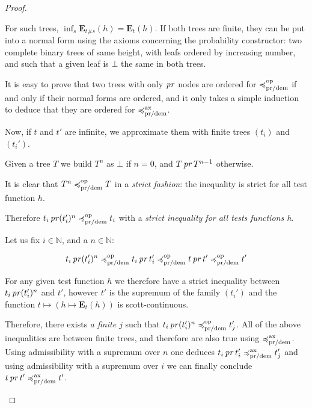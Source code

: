 \begin{proof}
\begin{itemize}
\begin{description}

    For such trees, $\inf_s \mathbf{E}_{ t \# s } (h)
    = \mathbf{E}_{ t } (h)$.
    If both trees are finite, they can be put into 
    a normal form using the axioms concerning the 
    probability constructor: two complete binary trees 
    of same height,
    with leafs ordered by increasing number, and 
    such that a given leaf is $\bot$ the same 
    in both trees.

    It is easy to prove that two trees with 
    only $\operatorname{\mathit{pr}}$ nodes are ordered for $\preccurlyeq^{\text{op}}_{\text{pr/dem}}$
    if and only if their normal forms are ordered,
    and it only takes a simple induction to 
    deduce that they are ordered for $\preccurlyeq^{\text{ax}}_{\text{pr/dem}}$.

    Now, if $t$ and $t'$ are infinite, 
    we approximate them with finite trees $(t_i)$ and 
    $(t_i')$.
    
    Given a tree $T$ we build $T^n$ as $\bot$ if $n = 0$, and $T \operatorname{\mathit{pr}} T^{n-1}$
    otherwise. 

    It is clear that $T^n \preccurlyeq^{\text{op}}_{\text{pr/dem}} T$ in a \emph{strict fashion}:
    the inequality is strict for all test function $h$.

    Therefore $t_i \operatorname{\mathit{pr}} (t_i')^n \preccurlyeq^{\text{op}}_{\text{pr/dem}} t_i$
    with a \emph{strict inequality for all tests functions h}.
    
    Let us fix $i \in \mathbb{N}$, and a $n \in \mathbb{N}$: 

    \begin{equation*}
        t_i \operatorname{\mathit{pr}} (t_i')^n \preccurlyeq^{\text{op}}_{\text{pr/dem}} t_i \operatorname{\mathit{pr}} t_i'
        \preccurlyeq^{\text{op}}_{\text{pr/dem}} t \operatorname{\mathit{pr}} t' \preccurlyeq^{\text{op}}_{\text{pr/dem}} t'
    \end{equation*}

    For any given test function $h$ we therefore have a strict 
    inequality between $t_i \operatorname{\mathit{pr}} (t_i')^n$ and $t'$, however 
    $t'$ is the supremum of the family $(t_i')$ and the function 
    $ t \mapsto (h \mapsto \mathbf{E}_{ t } (h))$ is scott-continuous.

    Therefore, there exists \emph{a finite $j$} such that 
    $t_i \operatorname{\mathit{pr}} (t_i')^n \preccurlyeq^{\text{op}}_{\text{pr/dem}} t_j'$.
    All of the above inequalities are between finite trees, and 
    therefore are also true using $\preccurlyeq^{\text{ax}}_{\text{pr/dem}}$.
    Using admissibility with a supremum over $n$ 
    one deduces $t_i \operatorname{\mathit{pr}} t_i' \preccurlyeq^{\text{ax}}_{\text{pr/dem}} t_j'$
    and using admissibility with a supremum over $i$ we can finally conclude
    $t \operatorname{\mathit{pr}} t' \preccurlyeq^{\text{ax}}_{\text{pr/dem}} t'$.
    

\end{description}
\end{itemize}
\end{proof}

